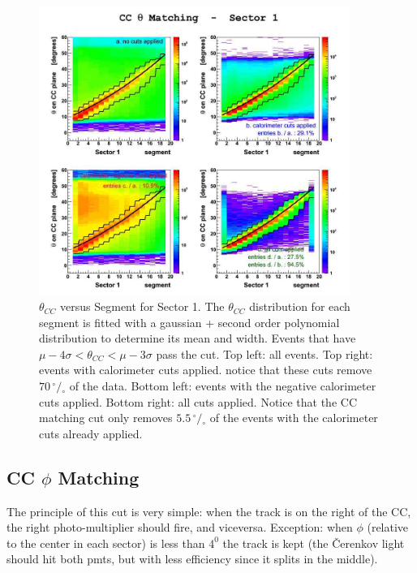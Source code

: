 \begin{figure}[h]
  \centering
		\includegraphics[width=0.9\textwidth]{img/cc_theta_matching_sect1.jpg}
		\caption{$\theta_{CC}$ versus Segment for Sector 1. The $\theta_{CC}$
               distribution for each segment is fitted with a gaussian +
               second order polynomial distribution to determine its mean
               and width. Events that have $\mu - 4\sigma < \theta_{CC} < \mu - 3\sigma$
               pass the cut.
               Top left: all events. Top right: events with calorimeter cuts applied.
               notice that these cuts remove $70 \,^{\circ\!\!}/\!_\circ$ of the data.
               Bottom left: events with the negative calorimeter cuts applied.
               Bottom right: all cuts applied. Notice that the CC matching cut
               only removes $5.5  \,^{\circ\!\!}/\!_\circ$ of the events with
               the calorimeter cuts already applied.}
 		\label{fig:ccm_theta}
\end{figure}

\clearpage\newpage

\subsection{CC $\phi$ Matching}
The principle of this cut is very simple: when the track is on the right of the CC, the right
photo-multiplier should fire, and viceversa. Exception: when $\phi$ (relative to the center
in each sector) is less than $4^0$ the track is kept (the \v Cerenkov light should hit both
pmts, but with less efficiency since it splits in the middle).

